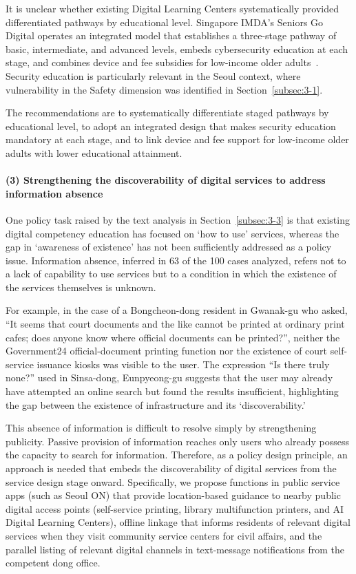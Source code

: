 It is unclear whether existing Digital Learning Centers systematically provided differentiated pathways by educational level. Singapore IMDA's Seniors Go Digital operates an integrated model that establishes a three-stage pathway of basic, intermediate, and advanced levels, embeds cybersecurity education at each stage, and combines device and fee subsidies for low-income older adults~\citep{IMDA2020, CSASingapore2023}. Security education is particularly relevant in the Seoul context, where vulnerability in the Safety dimension was identified in Section~\ref{subsec:3-1}.

The recommendations are to systematically differentiate staged pathways by educational level, to adopt an integrated design that makes security education mandatory at each stage, and to link device and fee support for low-income older adults with lower educational attainment.

\paragraph{(3) Strengthening the discoverability of digital services to address information absence}

One policy task raised by the text analysis in Section~\ref{subsec:3-3} is that existing digital competency education has focused on `how to use' services, whereas the gap in `awareness of existence' has not been sufficiently addressed as a policy issue. Information absence, inferred in 63 of the 100 cases analyzed, refers not to a lack of capability to use services but to a condition in which the existence of the services themselves is unknown.

For example, in the case of a Bongcheon-dong resident in Gwanak-gu who asked, ``It seems that court documents and the like cannot be printed at ordinary print cafes; does anyone know where official documents can be printed?'', neither the Government24 official-document printing function nor the existence of court self-service issuance kiosks was visible to the user. The expression ``Is there truly none?'' used in Sinsa-dong, Eunpyeong-gu suggests that the user may already have attempted an online search but found the results insufficient, highlighting the gap between the existence of infrastructure and its `discoverability.'

This absence of information is difficult to resolve simply by strengthening publicity. Passive provision of information reaches only users who already possess the capacity to search for information. Therefore, as a policy design principle, an approach is needed that embeds the discoverability of digital services from the service design stage onward. Specifically, we propose functions in public service apps (such as Seoul ON) that provide location-based guidance to nearby public digital access points (self-service printing, library multifunction printers, and AI Digital Learning Centers), offline linkage that informs residents of relevant digital services when they visit community service centers for civil affairs, and the parallel listing of relevant digital channels in text-message notifications from the competent dong office.

